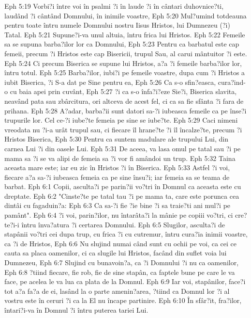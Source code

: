 Eph 5:19  Vorbi?i între voi în psalmi ?i în laude ?i în cântari duhovnice?ti, laudând ?i cântând Domnului, în inimile voastre,
Eph 5:20  Mul?umind totdeauna pentru toate întru numele Domnului nostru Iisus Hristos, lui Dumnezeu (?i) Tatal.
Eph 5:21  Supune?i-va unul altuia, întru frica lui Hristos.
Eph 5:22  Femeile sa se supuna barba?ilor lor ca Domnului,
Eph 5:23  Pentru ca barbatul este cap femeii, precum ?i Hristos este cap Bisericii, trupul Sau, al carui mântuitor ?i este.
Eph 5:24  Ci precum Biserica se supune lui Hristos, a?a ?i femeile barba?ilor lor, întru totul.
Eph 5:25  Barba?ilor, iubi?i pe femeile voastre, dupa cum ?i Hristos a iubit Biserica, ?i S-a dat pe Sine pentru ea,
Eph 5:26  Ca s-o sfin?easca, cura?ind-o cu baia apei prin cuvânt,
Eph 5:27  ?i ca s-o înfa?i?eze Sie?i, Biserica slavita, neavând pata sau zbârcitura, ori altceva de acest fel, ci ca sa fie sfânta ?i fara de prihana.
Eph 5:28  A?adar, barba?ii sunt datori sa-?i iubeasca femeile ca pe înse?i trupurile lor. Cel ce-?i iube?te femeia pe sine se iube?te.
Eph 5:29  Caci nimeni vreodata nu ?i-a urât trupul sau, ci fiecare îl hrane?te ?i îl încalze?te, precum ?i Hristos Biserica,
Eph 5:30  Pentru ca suntem madulare ale trupului Lui, din carnea Lui ?i din oasele Lui.
Eph 5:31  De aceea, va lasa omul pe tatal sau ?i pe mama sa ?i se va alipi de femeia sa ?i vor fi amândoi un trup.
Eph 5:32  Taina aceasta mare este; iar eu zic în Hristos ?i în Biserica.
Eph 5:33  Astfel ?i voi, fiecare a?a sa-?i iubeasca femeia ca pe sine însu?i; iar femeia sa se teama de barbat.
Eph 6:1  Copii, asculta?i pe parin?ii vo?tri în Domnul ca aceasta este cu dreptate.
Eph 6:2  "Cinste?te pe tatal tau ?i pe mama ta, care este porunca cea dintâi cu fagaduin?a:
Eph 6:3  Ca sa-?i fie ?ie bine ?i sa traie?ti ani mul?i pe pamânt".
Eph 6:4  ?i voi, parin?ilor, nu întarâta?i la mânie pe copiii vo?tri, ci cre?te?i-i întru înva?atura ?i certarea Domnului.
Eph 6:5  Slugilor, asculta?i de stapânii vo?tri cei dupa trup, cu frica ?i cu cutremur, întru cura?ia inimii voastre, ca ?i de Hristos,
Eph 6:6  Nu slujind numai când sunt cu ochii pe voi, ca cei ce cauta sa placa oamenilor, ci ca slugile lui Hristos, facând din suflet voia lui Dumnezeu,
Eph 6:7  Slujind cu bunavoin?a, ca ?i Domnului ?i nu ca oamenilor,
Eph 6:8  ?tiind fiecare, fie rob, fie de sine stapân, ca faptele bune pe care le va face, pe acelea le va lua ca plata de la Domnul.
Eph 6:9  Iar voi, stapânilor, face?i tot a?a fa?a de ei, lasând la o parte amenin?area, ?tiind ca Domnul lor ?i al vostru este în ceruri ?i ca la El nu încape partinire.
Eph 6:10  În sfâr?it, fra?ilor, întari?i-va în Domnul ?i întru puterea tariei Lui.
